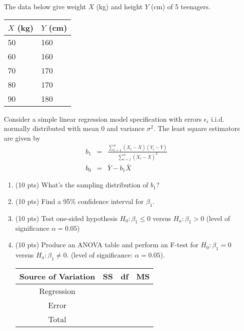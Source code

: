\documentclass[12pt]{article}
\begin{document}
 {
 The data below give weight $X$ (kg) and height $Y$ (cm)
 of 5 teenagers.

\begin{center}
\begin{tabular}{ll}
\toprule
$X$ (kg) & $Y$ (cm) \\
\midrule
50&160 \\
60&160 \\
70&170 \\
80&170 \\
90&180\\
\bottomrule
\end{tabular}
\end{center}

Consider a simple linear regression model specification
with errors $\epsilon_i$ i.i.d. normally distributed with mean 0 and variance $\sigma^2$. The least square estimators are given by
\begin{eqnarray*}
b_1&=&\frac{\sum_{i=1}^n(X_i-\bar{X})(Y_i-\bar{Y})}{\sum_{i=1}^n(X_i-\bar{X})^2}\\
b_0&=&\bar{Y}-b_1\bar{X}
\end{eqnarray*}
\begin{enumerate}
 \item (10 pts) What's the sampling distribution of $b_1$?
  \item (10 pts) Find a 95\% confidence interval for $\beta_1$.
  \item (10 pts) Test one-sided hypothesis $H_0: \beta_1\leq 0$ versus $H_a: \beta_1>0$ (level of significance $\alpha=0.05$)
  \item (10 pts) Produce an ANOVA table and perform an F-test for $H_0: \beta_1=0$ versus $H_a: \beta_1\neq 0$. (level of significance: $\alpha=0.05$).
      \begin{table}[!h]
\begin{center}

\begin{tabular}{|c|c|c|c|}
\hline Source of Variation& SS& df& MS \\\hline
Regression&\qquad\qquad\qquad \qquad &\qquad\qquad\qquad\qquad&\qquad\qquad\qquad\qquad\\\hline
Error& &&\\\hline
Total& &&\\\hline
\end{tabular}
\end{center}
\end{table}
\end{enumerate}

}
 { \vfill
  \answer
} {  }
\end{document}
